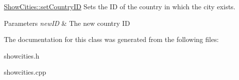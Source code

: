 \mbox{\hyperlink{class_show_cities_a853a958ebc2c0d42d872c237d431fe25}{Show\+Cities\+::set\+Country\+ID}} Sets the ID of the country in which the city exists. 


\begin{DoxyParams}{Parameters}
{\em new\+ID} & The new country ID \\
\hline
\end{DoxyParams}


The documentation for this class was generated from the following files\+:\begin{DoxyCompactItemize}
\item 
showcities.\+h\item 
showcities.\+cpp\end{DoxyCompactItemize}
